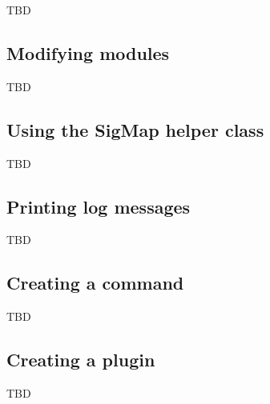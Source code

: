 \begin{frame}{\subsecname}
TBD
\end{frame}


\subsection{Modifying modules}

\begin{frame}{\subsecname}
TBD
\end{frame}


\subsection{Using the SigMap helper class}

\begin{frame}{\subsecname}
TBD
\end{frame}


\subsection{Printing log messages}

\begin{frame}{\subsecname}
TBD
\end{frame}


\subsection{Creating a command}

\begin{frame}{\subsecname}
TBD
\end{frame}


\subsection{Creating a plugin}

\begin{frame}{\subsecname}
TBD
\end{frame}

